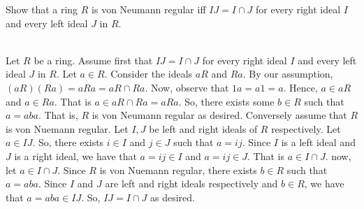 Show that a ring $R$ is von Neumann regular iff $IJ = I\cap J$ for every right ideal $I$ and every
left ideal $J$ in $R$.\\

\begin{solution}\renewcommand{\qedsymbol}{}\ \\
    Let $R$ be a ring. Assume first that $IJ=I\cap J$ for every right ideal $I$ and every left ideal $J$
    in $R$. Let $a\in R$. Consider the ideals $aR$ and $Ra$. By our assumption,
    $(aR)(Ra)=aRa=aR\cap Ra$. Now, observe that $1a=a1=a$. Hence, $a\in aR$ and $a\in Ra$. That is
    $a\in aR\cap Ra=aRa$. So, there exists some $b\in R$ such that $a=aba$. That is, $R$ is von Neumann
    regular as desired. Conversely assume that $R$ is von Nuemann regular. Let $I, J$ be left and right
    ideals of $R$ respectively. Let $a\in IJ$. So, there exists $i\in I$ and $j\in J$ such that $a=ij$.
    Since $I$ is a left ideal and $J$ is a right ideal, we have that $a=ij\in I$ and $a=ij\in J$. That
    is $a\in I\cap J$. now, let $a\in I\cap J$. Since $R$ is von Nuemann regular, there exists $b\in R$
    such that $a=aba$. Since $I$ and $J$ are left and right ideals respectively and $b\in R$, we have
    that $a=aba\in IJ$. So, $IJ=I\cap J$ as desired.

\end{solution}